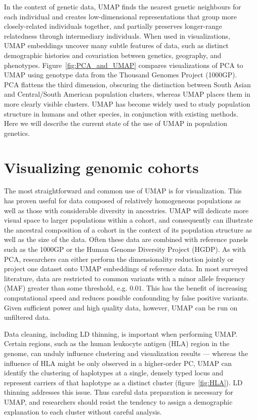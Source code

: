 In the context of genetic data, UMAP finds the nearest genetic neighbours for each individual and creates low-dimensional representations that group more closely-related individuals together, and partially preserves longer-range relatedness through intermediary individuals. When used in visualizations, UMAP embeddings uncover many subtle features of data, such as distinct demographic histories and covariation between genetics, geography, and phenotypes\citep{diaz-papkovich_umap_2019}. Figure~\ref{fig:PCA_and_UMAP} compares visualizations of PCA to UMAP using genotype data from the Thousand Genomes Project (1000GP)\citep{global_2015}. PCA flattens the third dimension, obscuring the distinction between South Asian and Central/South American population clusters, whereas UMAP places them in more clearly visible clusters. UMAP has become widely used to study population structure in humans and other species, in conjunction with existing methods. Here we will describe the current state of the use of UMAP in population genetics.

\section{Visualizing genomic cohorts}
The most straightforward and common use of UMAP is for visualization. This has proven useful for data composed of relatively homogeneous populations as well as those with considerable diversity in ancestries. UMAP will dedicate more visual space to larger populations within a cohort, and consequently can illustrate the ancestral composition of a cohort in the context of its population structure as well as the size of the data. Often these data are combined with reference panels such as the 1000GP or the Human Genome Diversity Project (HGDP)\citep{cann2002human}.  As with PCA, researchers can either perform the dimensionality reduction jointly or project one dataset onto UMAP embeddings of reference data. In most surveyed literature, data are restricted to common variants with a minor allele frequency (MAF) greater than some threshold, e.g. $0.01$. This has the benefit of increasing computational speed and reduces possible confounding by false positive variants. Given sufficient power and high quality data, however, UMAP can be run on unfiltered data.

Data cleaning, including LD thinning, is important when performing UMAP. Certain regions, such as the human leukocyte antigen (HLA) region in the genome, can unduly influence clustering and visualization results --- whereas the influence of HLA might be only observed in a higher-order PC, UMAP can identify the clustering of haplotypes at a single, densely typed locus and represent carriers of that haplotype as a distinct cluster (figure~\ref{fig:HLA}). LD thinning addresses this issue. Thus careful data preparation is necessary for UMAP, and researchers should resist the tendency to assign a demographic explanation to each cluster without careful analysis. 

